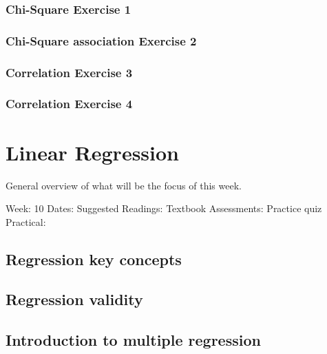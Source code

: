 \documentclass[
]{book}
\begin{document}
\hypertarget{chi-square-exercise-1}{%
\section{Chi-Square Exercise 1}\label{chi-square-exercise-1}}

\hypertarget{chi-square-association-exercise-2}{%
\section{Chi-Square association Exercise 2}\label{chi-square-association-exercise-2}}

\hypertarget{correlation-exercise-3}{%
\section{Correlation Exercise 3}\label{correlation-exercise-3}}

\hypertarget{correlation-exercise-4}{%
\section{Correlation Exercise 4}\label{correlation-exercise-4}}

\hypertarget{part-linear-regression}{%
\part{Linear Regression}\label{part-linear-regression}}

General overview of what will be the focus of this week.

Week: 10
Dates:
Suggested Readings: Textbook
Assessments: Practice quiz
Practical:

\hypertarget{regression-key-concepts}{%
\chapter{Regression key concepts}\label{regression-key-concepts}}

\hypertarget{regression-validity}{%
\chapter{Regression validity}\label{regression-validity}}

\hypertarget{introduction-to-multiple-regression}{%
\chapter{Introduction to multiple regression}\label{introduction-to-multiple-regression}}
\end{document}
